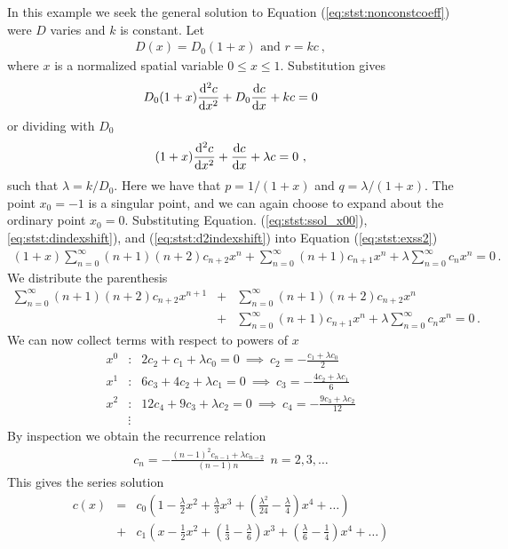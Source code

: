 \begin{example}
	In this example we seek the general solution to Equation (\ref{eq:stst:nonconstcoeff}) were $D$ varies and $k$ is constant. 
	Let 
	\begin{eqnarray}
		D(x) = D_0(1+x) \text{ and } r=kc  \ ,
	\end{eqnarray}
	where $x$ is a normalized spatial variable $0 \leq x \leq 1$. Substitution gives 
	\begin{eqnarray}
		D_0(1+x) \frac{\mathrm{d}^2 c}{\mathrm{d} x^2} + D_0 \frac{\mathrm{d} c}{\mathrm{d} x} + k c = 0
	\end{eqnarray}
	or dividing with $D_0$
	\begin{eqnarray}
		\label{eq:stst:exss2}
		(1+x) \frac{\mathrm{d}^2 c}{\mathrm{d} x^2} + \frac{\mathrm{d} c}{\mathrm{d} x} + \lambda c = 0 \ ,
	\end{eqnarray}
	such that $\lambda = k/D_0$. Here we have that $p = 1/(1 + x)$ and $q=\lambda/(1+x)$. The point
	$x_0=-1$ is a singular point, and we can again choose to expand about the ordinary point $x_0=0$. 
	Substituting Equation. (\ref{eq:stst:ssol_x00}), \ref{eq:stst:dindexshift}), and (\ref{eq:stst:d2indexshift}) 
	into Equation (\ref{eq:stst:exss2}) 
	\begin{eqnarray}
		(1+x)\sum_{n=0}^\infty (n+1)(n+2)c_{n+2}x^n + \sum_{n=0}^\infty (n+1)c_{n+1}x^n + 
		\lambda \sum_{n=0}^\infty c_n x^n = 0 \, .
	\end{eqnarray}
	We distribute the parenthesis 
	\begin{eqnarray}
		\sum_{n=0}^\infty (n+1)(n+2)c_{n+2}x^{n+1} &+& \sum_{n=0}^\infty (n+1)(n+2)c_{n+2}x^{n} 
		\nonumber \\
		&+& \sum_{n=0}^\infty (n+1)c_{n+1}x^n + \lambda \sum_{n=0}^\infty c_n x^n = 0 \, .
	\end{eqnarray}
	We can now collect terms with respect to powers of $x$
	\begin{eqnarray}
		x^0 &:& 2c_2 + c_1 + \lambda c_0 = 0 \ \implies \ c_2 = -\frac{c_1 + \lambda c_0}{2} \nonumber \\
		x^1 &:& 6c_3 + 4c_2 + \lambda c_1 = 0 \ \implies \ c_3 = -\frac{4c_2 + \lambda c_1}{6} \nonumber \\
		x^2 &:& 12c_4 + 9c_3 + \lambda c_2 = 0 \ \implies \ c_4 = -\frac{9c_3 + \lambda c_2}{12} \nonumber \\
		&\vdots& \nonumber
	\end{eqnarray}
	By inspection we obtain the recurrence relation
	\begin{eqnarray}
		c_n = - \frac{(n-1)^2c_{n-1} + \lambda c_{n-2}}{(n-1)n} \ \ n=2,3, \ldots
	\end{eqnarray}
	This gives the series solution
	\begin{eqnarray}
		c(x) &=& c_0 \left(1 - \frac{\lambda}{2} x^2 + \frac{\lambda}{3}x^3 + \left(
		\frac{\lambda^2}{24} - \frac{\lambda}{4} \right)x^4 + \ldots \right) \nonumber \\
		&+& c_1 \left(
			x - \frac{1}{2}x^2 + \left(\frac{1}{3}-\frac{\lambda}{6}\right)x^3 + \left( 
			\frac{\lambda}{6} - \frac{1}{4} \right)x^4 + \ldots
		\right)
	\end{eqnarray}
	


\end{example}
